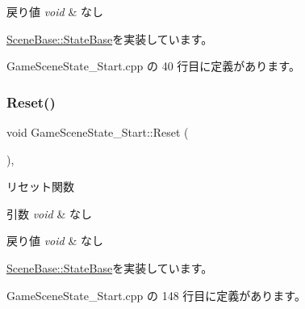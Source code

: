 \begin{DoxyRetVals}{戻り値}
{\em void} & なし \\
\hline
\end{DoxyRetVals}


\mbox{\hyperlink{class_scene_base_1_1_state_base_a33350231b039a2178c19beac0211c5b8}{Scene\+Base\+::\+State\+Base}}を実装しています。



 Game\+Scene\+State\+\_\+\+Start.\+cpp の 40 行目に定義があります。

\mbox{\label{class_game_scene_state___start_a59270f7b65613f580864ed8ea3056179}} 
\subsubsection{\texorpdfstring{Reset()}{Reset()}}
{\footnotesize\ttfamily void Game\+Scene\+State\+\_\+\+Start\+::\+Reset (\begin{DoxyParamCaption}{ }\end{DoxyParamCaption})\hspace{0.3cm}{\ttfamily [override]}, {\ttfamily [virtual]}}



リセット関数 


\begin{DoxyParams}{引数}
{\em void} & なし \\
\hline
\end{DoxyParams}

\begin{DoxyRetVals}{戻り値}
{\em void} & なし \\
\hline
\end{DoxyRetVals}


\mbox{\hyperlink{class_scene_base_1_1_state_base_a2e14a3afece0b1d8db9edcebf514a977}{Scene\+Base\+::\+State\+Base}}を実装しています。



 Game\+Scene\+State\+\_\+\+Start.\+cpp の 148 行目に定義があります。

\mbox{\label{class_game_scene_state___start_a636df8b7ac0173b044b0efc2927fb83b}} 
